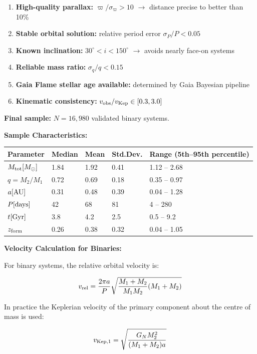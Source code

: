 \documentclass[11pt,a4paper]{article}
\providecommand{\tightlist}{\setlength{\itemsep}{0pt}\setlength{\parskip}{0pt}}
\begin{document}
\begin{enumerate}
\def\labelenumi{\arabic{enumi}.}
\tightlist
\item
  \textbf{High-quality parallax:} \(\varpi/\sigma_\varpi > 10\) $\rightarrow$
  distance precise to better than 10\%
\item
  \textbf{Stable orbital solution:} relative period error
  \(\sigma_P/P < 0.05\)
\item
  \textbf{Known inclination:} \(30^{\circ} < i < 150^{\circ}\) $\rightarrow$ avoids nearly face-on
  systems
\item
  \textbf{Reliable mass ratio:} \(\sigma_q/q < 0.15\)
\item
  \textbf{Gaia Flame stellar age available:} determined by Gaia Bayesian
  pipeline
\item
  \textbf{Kinematic consistency:}
  \(v_{\rm obs}/v_{\rm Kep} \in [0.3, 3.0]\)
\end{enumerate}

\textbf{Final sample:} \(N = 16,980\) validated binary systems.

\textbf{Sample Characteristics:}

\begin{longtable}[]{@{}lllll@{}}
\toprule\noalign{}
Parameter & Median & Mean & Std.Dev. & Range (5th--95th percentile) \\
\midrule\noalign{}
\endhead
\bottomrule\noalign{}
\endlastfoot
\(M_{\rm tot} [M_\odot]\) & 1.84 & 1.92 & 0.41 & 1.12 -- 2.68 \\
\(q = M_2/M_1\) & 0.72 & 0.69 & 0.18 & 0.35 -- 0.97 \\
\(a [\rm AU]\) & 0.31 & 0.48 & 0.39 & 0.04 -- 1.28 \\
\(P [\rm days]\) & 42 & 68 & 81 & 4 -- 280 \\
\(t [{\rm Gyr}]\) & 3.8 & 4.2 & 2.5 & 0.5 -- 9.2 \\
\(z_{\rm form}\) & 0.26 & 0.38 & 0.32 & 0.04 -- 1.05 \\
\end{longtable}

\textbf{Velocity Calculation for Binaries:}

For binary systems, the relative orbital velocity is:

\[v_{\rm rel} = \frac{2\pi a}{P}\sqrt{\frac{M_1 + M_2}{M_1 M_2}(M_1 + M_2)}\]

In practice the Keplerian velocity of the primary component about the
centre of mass is used:

\[v_{\rm Kep,1} = \sqrt{\frac{G_N M_2^2}{(M_1+M_2)a}}\]
\end{document}
